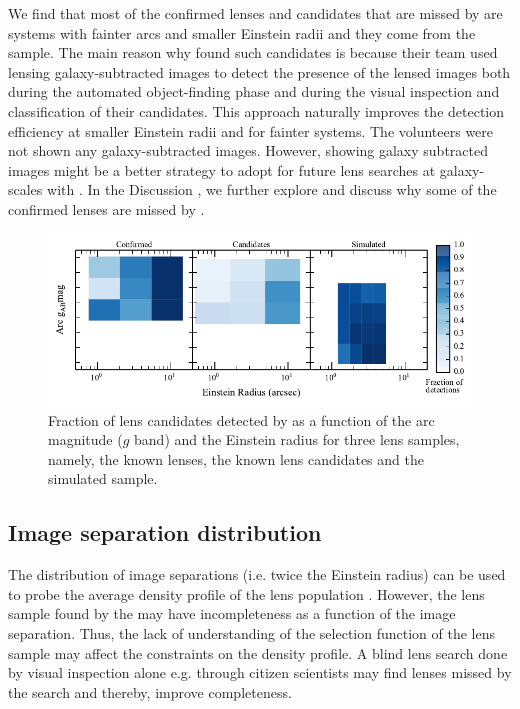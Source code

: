 \documentclass[useAMS,usenatbib,a4paper]{mn2e}
\begin{document}
We find that most of the confirmed lenses and candidates that are missed
by \sw are systems with fainter arcs and smaller Einstein radii and they
come from the \rf sample. The main reason why \rf found such candidates
is because their team used lensing galaxy-subtracted images to detect
the presence of the lensed images both during the automated
object-finding phase and during the visual inspection and classification
of their candidates. This approach naturally improves the detection
efficiency at smaller Einstein radii and for fainter systems. The \sw
volunteers were not shown any galaxy-subtracted images. However, showing
galaxy subtracted images might be a better strategy to adopt for future
lens searches at galaxy-scales with \sw. In the Discussion
, we further explore and discuss why some of the confirmed
lenses are missed by \sw.

\begin{figure}
\begin{center}
\includegraphics[scale=1.0]{sw-cfhtls-figs/comp_reinst_mag.pdf}
\caption{ \label{fig:compre} Fraction of lens candidates detected by \sw as a
function of the arc magnitude ($g$ band) and the Einstein radius for three lens
samples, namely, the known lenses, the known lens candidates and the simulated
sample. }
\end{center}
\end{figure}


\subsection{Image separation distribution}
\label{sec:results:isd}

The distribution of image separations (i.e. twice the Einstein radius)
can be used to probe the average density profile of the lens population
\citep{Oguri2006,More2012}.  However, the lens sample found by the \af
may have incompleteness as a function of the image separation. Thus, the
lack of understanding of the selection function of the lens sample may
affect the constraints on the density profile. A blind lens search done
by visual inspection alone e.g. through \sw citizen scientists may find
lenses missed by the \af search and thereby, improve completeness.
\end{document}
